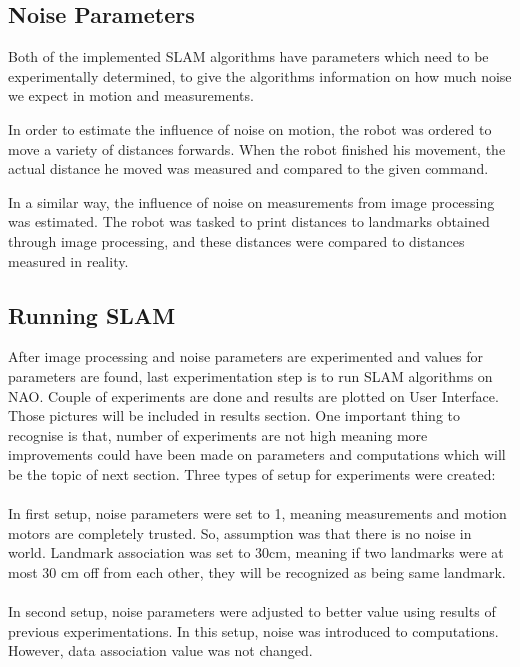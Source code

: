 \documentclass{ba-kecs}
\numberwithin{figure}{section}
\numberwithin{equation}{section}
\begin{document}
{\subsection{Noise Parameters}
Both of the implemented SLAM algorithms have parameters which need to be experimentally determined, to give the algorithms information on how much noise we expect in motion and measurements.

In order to estimate the influence of noise on motion, the robot was ordered to move a variety of distances forwards. When the robot finished his movement, the actual distance he moved was measured and compared to the given command.

In a similar way, the influence of noise on measurements from image processing was estimated. The robot was tasked to print distances to landmarks obtained through image processing, and these distances were compared to distances measured in reality.

\subsection{Running SLAM}
After image processing and noise parameters are experimented and values for parameters are found, last experimentation step is to run SLAM algorithms on NAO. Couple of experiments are done and results are plotted on User Interface. Those pictures will be included in results section. One important thing to recognise is that, number of experiments are not high meaning more improvements could have been made on parameters and computations which will be the topic of next section. Three types of setup for experiments were created:\\ \\

In first setup, noise parameters were set to 1, meaning measurements and motion motors are completely trusted. So, assumption was that there is no noise in world. Landmark association was set to 30cm, meaning if two landmarks were at most 30 cm off from each other, they will be recognized as being same landmark.\\ \\

In second setup, noise parameters were adjusted to better value using results of previous experimentations. In this setup, noise was introduced to computations. However, data association value was not changed.\\ \\

}
\end{document}
